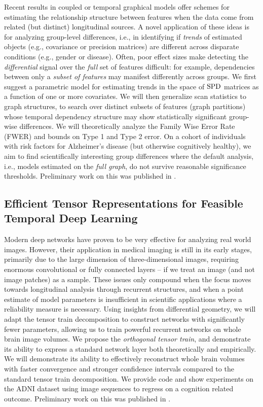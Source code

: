 Recent results in coupled or temporal graphical models offer schemes for estimating the relationship structure 
between features when the data come from
related (but distinct) longitudinal sources. A novel application of these ideas is for analyzing group-level differences, i.e., in identifying if {\em trends} of estimated objects (e.g., 
covariance or precision matrices) are different across disparate conditions (e.g., gender or disease). Often, poor effect sizes make detecting the \textit{differential} signal 
over the {\em full} set of features difficult: for example, 
dependencies between only a {\em subset of features} may manifest differently across groups.
We first suggest
a parametric model 
for estimating trends in the space of $\text{SPD}$ matrices as a function of one or more covariates.
We will then generalize scan statistics to graph structures, 
to search over distinct subsets of features (graph partitions) whose temporal dependency structure may show statistically 
significant group-wise differences.
We will theoretically analyze the Family Wise Error Rate (FWER) and bounds on Type 1 and Type 2 error. 
On a cohort of individuals with risk factors for Alzheimer's disease (but otherwise cognitively healthy), 
we aim to 
find scientifically interesting 
group differences where the default analysis, 
i.e., models estimated on the {\em full graph}, do not survive reasonable 
significance thresholds. 
Preliminary work on this was published in \citep{covtraj}.


\subsection{Efficient Tensor Representations for Feasible Temporal Deep Learning}

Modern deep networks have proven to be very effective for analyzing real world images.
However, their application in medical imaging is still in its early stages,
primarily due to the large dimension of three-dimensional images, requiring enormous convolutional or fully connected layers --
if we treat an image (and not image patches) as a sample. 
These issues only compound when the focus moves towards longitudinal analysis
through recurrent structures, and when a point estimate of model parameters is insufficient 
in scientific applications where a reliability measure is necessary.
Using insights from differential geometry, 
we will adapt 
the tensor train decomposition to construct networks
with significantly fewer parameters,
allowing us to train powerful recurrent networks on whole brain image volumes. 
We propose 
the \textit{orthogonal tensor train},
and demonstrate its ability to express a standard network layer both theoretically and empirically.
We will 
demonstrate its ability to 
effectively reconstruct whole brain volumes
with faster convergence and stronger confidence intervals
compared to the standard tensor train decomposition. 
We provide code and show experiments on the ADNI dataset
using image sequences to regress on a cognition related outcome.
Preliminary work on this was published in \citep{ott}.


